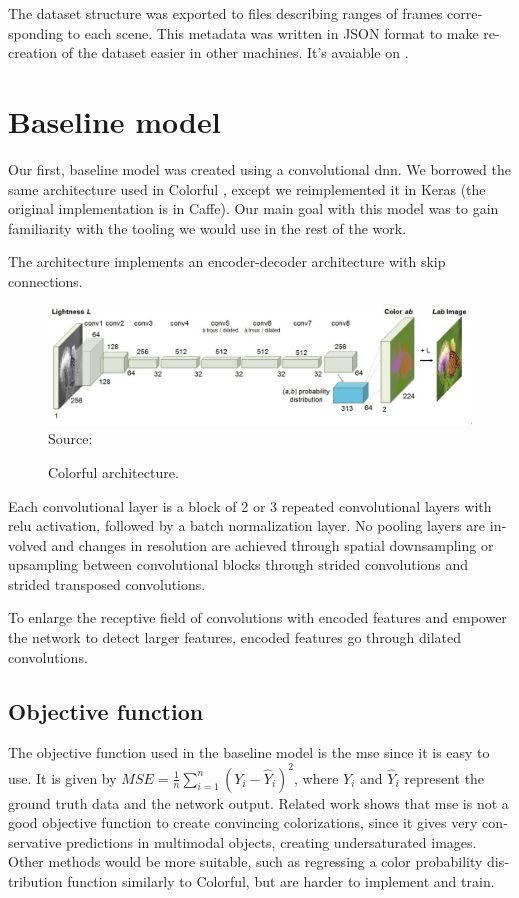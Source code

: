\documentclass[12pt,openright,oneside,a4paper,english, brazilian]{abntex2}
\begin{document}
\begin{otherlanguage}{english}
The dataset structure was exported to files describing ranges of frames corresponding to each scene. This metadata was written in JSON format to make re-creation of the dataset easier in other machines. It's avaiable on \cite{colormotion_dataset}.

\section{Baseline model}

Our first, baseline model was created using a convolutional \acrshort{dnn}. We borrowed the same architecture used in Colorful \cite{colorful}, except we reimplemented it in Keras (the original implementation is in Caffe). Our main goal with this model was to gain familiarity with the tooling we would use in the rest of the work.

The architecture implements an encoder-decoder architecture with skip connections.

\begin{figure}[!htb]
\centering
\caption{Colorful architecture.}
\includegraphics[width=\textwidth]{Colorful}
Source: \cite{colorful}
\label{colorful_architecture_paper}
\end{figure}

Each convolutional layer is a block of 2 or 3 repeated convolutional layers with \acrshort{relu} activation, followed by a batch normalization layer. No pooling layers are involved and changes in resolution are achieved through spatial downsampling or upsampling between convolutional blocks through strided convolutions and strided transposed convolutions.

To enlarge the receptive field of convolutions with encoded features and empower the network to detect larger features, encoded features go through dilated convolutions.

\subsection{Objective function}

The objective function used in the baseline model is the \acrshort{mse} since it is easy to use. It is given by $MSE = \frac{1}{n}\sum_{i=1}^{n}(Y_i - \hat{Y}_i)^2$, where $Y_i$ and $\hat{Y}_i$ represent the ground truth data and the network output. Related work \cite{colorful} shows that \acrshort{mse} is not a good objective function to create convincing colorizations, since it gives very conservative predictions in multimodal objects, creating undersaturated images. Other methods would be more suitable, such as regressing a color probability distribution function similarly to Colorful, but are harder to implement and train.


\end{otherlanguage}
\end{document}
